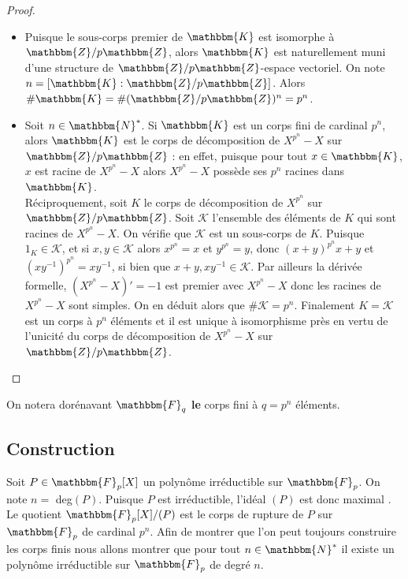 \documentclass[12pt]{article}
\theoremstyle{remark}\newtheorem{note}{Note}
\theoremstyle{remark}\newtheorem{nota}{Notation}
\newcommand{\N}{\mathbbm{N}}
\newcommand{\Z}{\mathbbm{Z}}
\newcommand{\K}{\mathbbm{K}}
\newcommand{\F}{\mathbbm{F}}
\theoremstyle{definition}
\begin{document}
\begin{proof}\hspace{12pt}
\begin{itemize}
\item Puisque le sous-corps premier de $\K$ est isomorphe à $\Z / p \Z$, alors $\K$ est naturellement muni d'une structure de $\Z / p \Z$-espace vectoriel. On note $n = [ \K : \Z / p \Z ]$. Alors $\# \K = \# (\Z / p \Z)^n = p^n$.
\item Soit $n \in \N^{*}$. Si $\K$ est un corps fini de cardinal $p^n$, alors $\K$ est le corps de décomposition de $X^{p^n} - X$ sur $\Z / p \Z$ : en effet, puisque pour tout $x \in \K$, $x$ est racine de $X^{p^n} - X$ alors $X^{p^n} - X$ possède ses $p^n$ racines dans $\K$.\\
Réciproquement, soit $K$ le corps de décomposition de $X^{p^n}$ sur $\Z / p \Z$. Soit $\mathcal{K}$ l'ensemble des éléments de $K$ qui sont racines de $X^{p^n} - X$. On vérifie que $\mathcal{K}$ est un sous-corps de $K$. Puisque $1_K \in \mathcal{K}$, et si $x,y \in \mathcal{K}$ alors $x^{p^n}= x$ et $y^{p^n} = y$, donc $(x+y)^{p^n} x + y$ et $(xy^{-1})^{p^n} = xy^{-1}$, si bien que $x + y, xy^{-1} \in \mathcal{K}$. Par ailleurs la dérivée formelle, $(X^{p^n} - X)' = -1$ est premier avec $X^{p^n} - X$ donc les racines de $X^{p^n} - X$ sont simples. On en déduit alors que $\# \mathcal{K} = p^n$. Finalement $K = \mathcal{K}$ est un corps à $p^n$ éléments et il est unique à isomorphisme près en vertu de l'unicité du corps de décomposition de $X^{p^n} - X$ sur $\Z / p \Z$.
\end{itemize}
\end{proof}
On notera dorénavant $\F_q$ \textbf{le} corps fini à $q = p^n$ éléments.
\subsection{Construction}
Soit $P \in \F_p [X]$ un polynôme irréductible sur $\F_p$. On note $n = $ deg$(P)$. Puisque $P$ est irréductible, l'idéal $(P)$ est donc maximal%
. Le quotient $\F_p [X] / (P)$ est le corps de rupture de $P$ sur $\F_p$ de cardinal $p^n$. Afin de montrer que l'on peut toujours construire les corps finis nous allons montrer que pour tout $n \in \N^{*}$ il existe un polynôme irréductible sur $\F_p$ de degré $n$.
\end{document}
